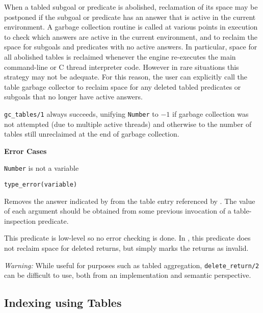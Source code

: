 \begin{description}
\begin{description}

%
When a tabled subgoal or predicate is abolished, reclamation of its
space may be postponed if the subgoal or predicate has an answer that
is active in the current environment.  A garbage collection routine is
called at various points in execution to check which answers are
active in the current environment, and to reclaim the space for
subgoals and predicates with no active answers.  In particular, space
for all abolished tables is reclaimed whenever the engine re-executes
the main command-line or C thread interpreter code.  However in rare
situations this strategy may not be adequate.  For this reason, the
user can explicitly call the table garbage collector to reclaim space
for any deleted tabled predicates or subgoals that no longer have
active answers.

{\tt gc\_tables/1} always succeeds, unifying {\tt Number} to $-1$ if
garbage collection was not attempted (due to multiple active threads)
and otherwise to the number of tables still unreclaimed at the end of
garbage collection.

{\bf Error Cases}
\bi
\item {\tt Number} is not a variable
\bi
\item 	{\tt type\_error(variable)}
\ei
\ei


%
Removes the answer indicated by  from the table
entry referenced by .  The value of each
argument should be obtained from some previous invocation of a
table-inspection predicate.

This predicate is low-level so no error checking is done.  In \version
, this predicate does not reclaim space for deleted returns, but
simply marks the returns as invalid.

{\em Warning: } While useful for purposes such as tabled aggregation,
{\tt delete\_return/2} can be difficult to use, both from an
implementation and semantic perspective.  


\subsection{Indexing using Tables}


\end{description}
\end{description}
